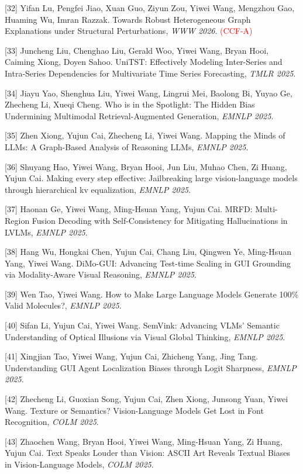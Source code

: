 [32] Yifan Lu, Pengfei Jiao, Xuan Guo, Ziyun Zou, Yiwei Wang, Mengzhou Gao, Huaming Wu, Imran Razzak. Towards Robust Heterogeneous Graph Explanations under Structural Perturbations, \textit{WWW 2026}. \textcolor{red}{(CCF-A)}

[33] Juncheng Liu, Chenghao Liu, Gerald Woo, Yiwei Wang, Bryan Hooi, Caiming Xiong, Doyen Sahoo. UniTST: Effectively Modeling Inter-Series and Intra-Series Dependencies for Multivariate Time Series Forecasting, \textit{TMLR 2025}.

[34] Jiayu Yao, Shenghua Liu, Yiwei Wang, Lingrui Mei, Baolong Bi, Yuyao Ge, Zhecheng Li, Xueqi Cheng. Who is in the Spotlight: The Hidden Bias Undermining Multimodal Retrieval-Augmented Generation, \textit{EMNLP 2025}.

[35] Zhen Xiong, Yujun Cai, Zhecheng Li, Yiwei Wang. Mapping the Minds of LLMs: A Graph-Based Analysis of Reasoning LLMs, \textit{EMNLP 2025}.

[36] Shuyang Hao, Yiwei Wang, Bryan Hooi, Jun Liu, Muhao Chen, Zi Huang, Yujun Cai. Making every step effective: Jailbreaking large vision-language models through hierarchical kv equalization, \textit{EMNLP 2025}.

[37] Haonan Ge, Yiwei Wang, Ming-Hsuan Yang, Yujun Cai. MRFD: Multi-Region Fusion Decoding with Self-Consistency for Mitigating Hallucinations in LVLMs, \textit{EMNLP 2025}.

[38] Hang Wu, Hongkai Chen, Yujun Cai, Chang Liu, Qingwen Ye, Ming-Hsuan Yang, Yiwei Wang. DiMo-GUI: Advancing Test-time Scaling in GUI Grounding via Modality-Aware Visual Reasoning, \textit{EMNLP 2025}.

[39] Wen Tao, Yiwei Wang. How to Make Large Language Models Generate 100\% Valid Molecules?, \textit{EMNLP 2025}.

[40] Sifan Li, Yujun Cai, Yiwei Wang. SemVink: Advancing VLMs' Semantic Understanding of Optical Illusions via Visual Global Thinking, \textit{EMNLP 2025}.

[41] Xingjian Tao, Yiwei Wang, Yujun Cai, Zhicheng Yang, Jing Tang. Understanding GUI Agent Localization Biases through Logit Sharpness, \textit{EMNLP 2025}.

[42] Zhecheng Li, Guoxian Song, Yujun Cai, Zhen Xiong, Junsong Yuan, Yiwei Wang. Texture or Semantics? Vision-Language Models Get Lost in Font Recognition, \textit{COLM 2025}.

[43] Zhaochen Wang, Bryan Hooi, Yiwei Wang, Ming-Hsuan Yang, Zi Huang, Yujun Cai. Text Speaks Louder than Vision: ASCII Art Reveals Textual Biases in Vision-Language Models, \textit{COLM 2025}.

